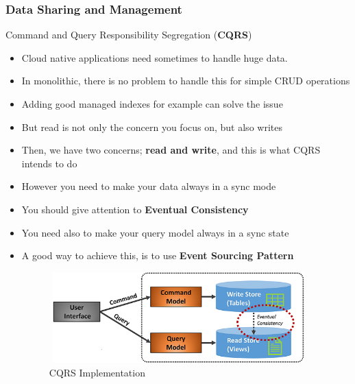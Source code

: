 \documentclass{beamer}
\begin{document}
	\begin{frame}
		\frametitle{Data Sharing and Management}
		Command and Query Responsibility Segregation (\textbf{CQRS})
			\begin{itemize}
				\item<1->[] \small{Cloud native applications need sometimes to handle huge data.}
				\vspace{1mm}
				\item<1-> \scriptsize{In monolithic, there is no problem to handle this for simple CRUD operations}
				\item<1-> \scriptsize{Adding good managed indexes for example can solve the issue}
				\item<1-> \scriptsize{But read is not only the concern you focus on, but also writes}
				\item<1-> \scriptsize{Then, we have two concerns; \textbf{read and write}, and this is what CQRS intends to do}
				\item<1-> \scriptsize{However you need to make your data always in a sync mode}
				\item<1-> \scriptsize{You should give attention to \textbf{Eventual Consistency}}
				\item<1-> \scriptsize{\alert{You need also to make your query model always in a sync state}}
				\item<2-> \scriptsize{A good way to achieve this, is to use \textbf{Event Sourcing Pattern}}
					\begin{figure}[h]
						\includegraphics[width=100mm,height= 35mm, scale=1]{img/cqrs-implementation.png}
						\caption{CQRS Implementation}
					\end{figure}
			\end{itemize}
	\end{frame}
\end{document}
